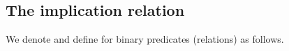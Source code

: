 \documentclass[a4paper,UKenglish,cleveref,autoref,thm-restate,11pt]{lipics-v2021}
\begin{document}
\subsection{The implication relation}\label{implication}

We denote and define  for binary predicates (relations) as follows.
\ccpad
\begin{code}%
\>[0]\AgdaSpace{}%
\AgdaSymbol{:}\AgdaSpace{}%
\AgdaSymbol{\{}\AgdaSpace{}%
\AgdaSpace{}%
\AgdaSpace{}%
\AgdaSymbol{:}\AgdaSpace{}%
\AgdaSymbol{\}\{}\AgdaSpace{}%
\AgdaSymbol{:}\AgdaSpace{}%
\AgdaSpace{}%
\AgdaSymbol{\}\{}\AgdaSpace{}%
\AgdaSymbol{:}\AgdaSpace{}%
\AgdaSpace{}%
\AgdaSymbol{\}\{}\AgdaSpace{}%
\AgdaSymbol{:}\AgdaSpace{}%
\AgdaSpace{}%
\AgdaSymbol{\}}\<%
\\
\>[0][@{}l@{\AgdaIndent{0}}]%
\>[1]%
\>[7]\AgdaSymbol{(}\AgdaSpace{}%
\AgdaSpace{}%
\AgdaSpace{}%
\AgdaSpace{}%
\AgdaSymbol{)}\AgdaSpace{}%
\AgdaSpace{}%
\AgdaSymbol{(}\AgdaSpace{}%
\AgdaSpace{}%
\AgdaSymbol{)}\AgdaSpace{}%
\AgdaSpace{}%
\AgdaSymbol{(}\AgdaSpace{}%
\AgdaSpace{}%
\AgdaSpace{}%
\AgdaSpace{}%
\AgdaSymbol{)}\<%
\\
%
\\[\AgdaEmptyExtraSkip]%
\>[0]\AgdaSpace{}%
\AgdaSpace{}%
\AgdaSpace{}%
\AgdaSymbol{=}\AgdaSpace{}%
\AgdaSpace{}%
\AgdaSpace{}%
\AgdaSpace{}%
\AgdaSpace{}%
\AgdaSpace{}%
\AgdaSymbol{(}\AgdaSpace{}%
\AgdaSymbol{)}\AgdaSpace{}%
\AgdaSymbol{(}\AgdaSpace{}%
\AgdaSymbol{)}\<%
\\
%
\\[\AgdaEmptyExtraSkip]%
%
\\[\AgdaEmptyExtraSkip]%
\>[0]\AgdaSpace{}%
\AgdaSymbol{:}\AgdaSpace{}%
\AgdaSymbol{\{}\AgdaSpace{}%
\AgdaSpace{}%
\AgdaSpace{}%
\AgdaSpace{}%

\end{code}
\end{document}
